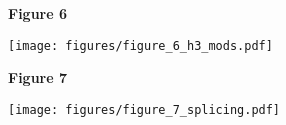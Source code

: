 \documentclass[8pt]{extarticle}
\begin{document}

\newpage

\textbf{\large Figure 6}

\texttt{[image: figures/figure\_6\_h3\_mods.pdf]}


\newpage

\textbf{\large Figure 7}

\texttt{[image: figures/figure\_7\_splicing.pdf]}
\end{document}
